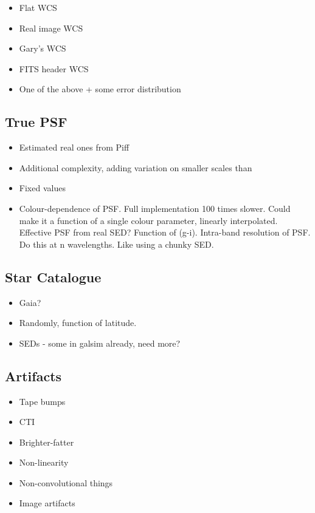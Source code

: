 \documentclass[\docopts]{\docclass}
\begin{document}
\begin{itemize}
\item Flat WCS
\item Real image WCS
\item Gary's WCS
\item FITS header WCS
\item One of the above + some error distribution
\end{itemize}

\subsection{True PSF}

\begin{itemize}
\item Estimated real ones from Piff
\item Additional complexity, adding variation on smaller scales than 
\item Fixed values
\item Colour-dependence of PSF.
	  Full implementation 100 times slower.
	  Could make it a function of a single colour parameter, linearly interpolated.
	  Effective PSF from real SED? Function of (g-i).
	  Intra-band resolution of PSF.  Do this at n wavelengths.
	  Like using a chunky SED.
\end{itemize}

\subsection{Star Catalogue}

\begin{itemize}
\item Gaia?
\item Randomly, function of latitude.
\item SEDs - some in galsim already, need more?
\end{itemize}

\subsection{Artifacts}
\begin{itemize}
\item Tape bumps
\item CTI
\item Brighter-fatter
\item Non-linearity
\item Non-convolutional things
\item Image artifacts
\end{itemize}
\end{document}
